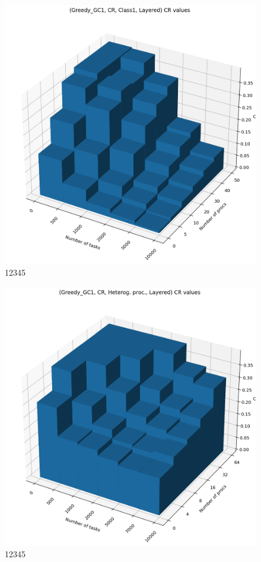 \begin{figure}[!htbp]
    \centering
    \includegraphics[width=\textwidth]{imgs/layered_class_1/CR/cr_3d.png}
    \caption{12345}    
\end{figure}

\begin{figure}[!htbp]
    \centering
    \includegraphics[width=\textwidth]{imgs/unbalanced/CR/cr_3d.png}
    \caption{12345}
\end{figure}


